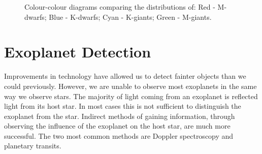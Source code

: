 \begin{figure}
	\centering
	\caption{Colour-colour diagrams comparing the distributions of: Red - M-dwarfs; Blue - K-dwarfs; Cyan - K-giants; Green - M-giants.}
	\label{FigColComp}
\end{figure}
\section{Exoplanet Detection}
Improvements in technology have allowed us to detect fainter objects than we could previously. However, we are unable to observe most exoplanets in the same way we observe stars. The majority of light coming from an exoplanet is reflected light from its host star. In most cases this is not sufficient to distinguish the exoplanet from the star. Indirect methods of gaining information, through observing the influence of the exoplanet on the host star, are much more successful. The two most common methods are Doppler spectroscopy and planetary transits.

